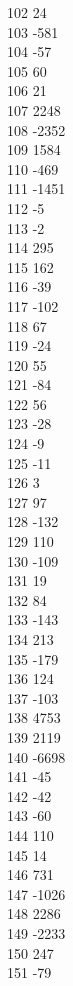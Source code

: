 { 102	24 \\
 103	-581 \\
 104	-57 \\
 105	60 \\
 106	21 \\
 107	2248 \\
 108	-2352 \\
 109	1584 \\
 110	-469 \\
 111	-1451 \\
 112	-5 \\
 113	-2 \\
 114	295 \\
 115	162 \\
 116	-39 \\
 117	-102 \\
 118	67 \\
 119	-24 \\
 120	55 \\
 121	-84 \\
 122	56 \\
 123	-28 \\
 124	-9 \\
 125	-11 \\
 126	3 \\
 127	97 \\
 128	-132 \\
 129	110 \\
 130	-109 \\
 131	19 \\
 132	84 \\
 133	-143 \\
 134	213 \\
 135	-179 \\
 136	124 \\
 137	-103 \\
 138	4753 \\
 139	2119 \\
 140	-6698 \\
 141	-45 \\
 142	-42 \\
 143	-60 \\
 144	110 \\
 145	14 \\
 146	731 \\
 147	-1026 \\
 148	2286 \\
 149	-2233 \\
 150	247 \\
 151	-79 \\
}
